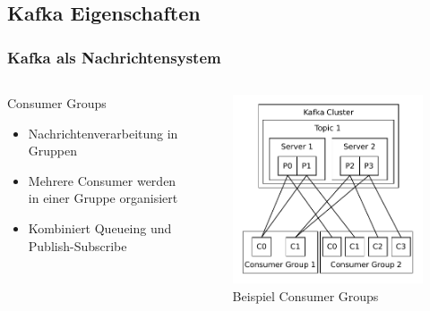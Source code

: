 \subsection{Kafka Eigenschaften}
\begin{frame}
\frametitle{Kafka als Nachrichtensystem}
\centering
\begin{columns}[T] %
	\begin{column}[T]{.5\textwidth} 
		Consumer Groups
		\begin{itemize}
			\item Nachrichtenverarbeitung in Gruppen
			\item Mehrere Consumer werden in einer Gruppe organisiert
			\item Kombiniert Queueing und Publish-Subscribe
		\end{itemize}
	\end{column}
	\begin{column}[T]{.5\textwidth}
		\begin{figure}
		\centering
		\includegraphics[scale=0.7]{figure/consumer_groups.pdf}
		\caption{Beispiel Consumer Groups~\cite{Kafka}}
		\end{figure}
	\end{column}
\end{columns}



\end{frame}

